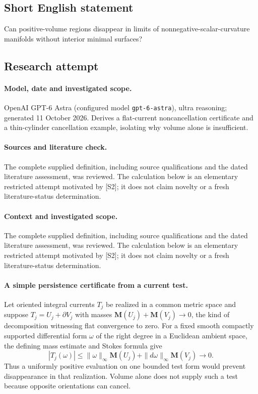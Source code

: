 \documentclass[11pt]{article}
\begin{document}
\subsection{Short English statement}
Can positive-volume regions disappear in limits of nonnegative-scalar-curvature manifolds without interior minimal surfaces?
\subsection{Research attempt}
\paragraph{Model, date and investigated scope.}
OpenAI GPT-6 Astra (configured model \texttt{gpt-6-astra}), ultra reasoning; generated 11 October 2026. Derives a flat-current noncancellation certificate and a thin-cylinder cancellation example, isolating why volume alone is insufficient.

\paragraph{Sources and literature check.}
The complete supplied definition, including source qualifications and the dated literature assessment, was reviewed. The calculation below is an elementary restricted attempt motivated by [S2]; it does not claim novelty or a fresh literature-status determination.

\paragraph{Context and investigated scope.} The complete supplied definition, including source qualifications and the dated literature assessment, was reviewed. The calculation below is an elementary restricted attempt motivated by [S2]; it does not claim novelty or a fresh literature-status determination.

\paragraph{A simple persistence certificate from a current test.} Let oriented integral currents $T_j$ be realized in a common metric space and suppose $T_j=U_j+\partial V_j$ with masses $\mathbf M(U_j)+\mathbf M(V_j)\to0$, the kind of decomposition witnessing flat convergence to zero. For a fixed smooth compactly supported differential form $\omega$ of the right degree in a Euclidean ambient space, the defining mass estimate and Stokes formula give
\[
 |T_j(\omega)|\leq\|\omega\|_\infty\mathbf M(U_j)+\|d\omega\|_\infty\mathbf M(V_j)\to0.
\]
Thus a uniformly positive evaluation on one bounded test form would prevent disappearance in that realization. Volume alone does not supply such a test because opposite orientations can cancel.
\end{document}
